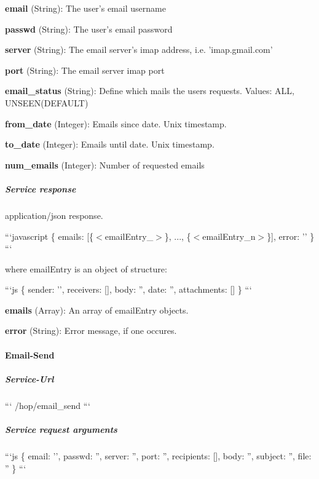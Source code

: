 \begin{DoxyItemize}
\item {\bfseries email} (String)\-: The user's email username
\item {\bfseries passwd} (String)\-: The user's email password
\item {\bfseries server} (String)\-: The email server's imap address, i.\-e. 'imap.\-gmail.\-com'
\item {\bfseries port} (String)\-: The email server imap port
\item {\bfseries email\-\_\-status} (String)\-: Define which mails the users requests. Values\-: A\-L\-L, U\-N\-S\-E\-E\-N(\-D\-E\-F\-A\-U\-L\-T)
\item {\bfseries from\-\_\-date} (Integer)\-: Emails since date. Unix timestamp.
\item {\bfseries to\-\_\-date} (Integer)\-: Emails until date. Unix timestamp.
\item {\bfseries num\-\_\-emails} (Integer)\-: Number of requested emails
\end{DoxyItemize}

\subparagraph*{Service response}

application/json response.

```javascript \{ emails\-: \mbox{[}\{$<$email\-Entry\-\_$>$\}, ..., \{$<$email\-Entry\-\_\-n$>$\}\mbox{]}, error\-: '' \} ```

where email\-Entry is an object of structure\-:

```js \{ sender\-: '', receivers\-: \mbox{[}\mbox{]}, body\-: '', date\-: '', attachments\-: \mbox{[}\mbox{]} \} ```


\begin{DoxyItemize}
\item {\bfseries emails} (Array)\-: An array of email\-Entry objects.
\item {\bfseries error} (String)\-: Error message, if one occures.
\end{DoxyItemize}

\paragraph*{Email-\/\-Send}

\subparagraph*{Service-\/\-Url}

``` /hop/email\-\_\-send ```

\subparagraph*{Service request arguments}

```js \{ email\-: '', passwd\-: '', server\-: '', port\-: '', recipients\-: \mbox{[}\mbox{]}, body\-: '', subject\-: '', file\-: '' \} ```


